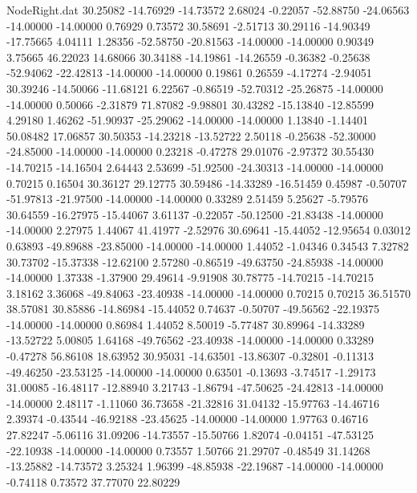 \begin{filecontents}{NodeRight.dat}
  30.25082  -14.76929  -14.73572     2.68024   -0.22057  -52.88750  -24.06563  -14.00000  -14.00000    0.76929    0.73572   30.58691   -2.51713
  30.29116  -14.90349  -17.75665     4.04111    1.28356  -52.58750  -20.81563  -14.00000  -14.00000    0.90349    3.75665   46.22023   14.68066
  30.34188  -14.19861  -14.26559    -0.36382   -0.25638  -52.94062  -22.42813  -14.00000  -14.00000    0.19861    0.26559   -4.17274   -2.94051
  30.39246  -14.50066  -11.68121     6.22567   -0.86519  -52.70312  -25.26875  -14.00000  -14.00000    0.50066   -2.31879   71.87082   -9.98801
  30.43282  -15.13840  -12.85599     4.29180    1.46262  -51.90937  -25.29062  -14.00000  -14.00000    1.13840   -1.14401   50.08482   17.06857
  30.50353  -14.23218  -13.52722     2.50118   -0.25638  -52.30000  -24.85000  -14.00000  -14.00000    0.23218   -0.47278   29.01076   -2.97372
  30.55430  -14.70215  -14.16504     2.64443    2.53699  -51.92500  -24.30313  -14.00000  -14.00000    0.70215    0.16504   30.36127   29.12775
  30.59486  -14.33289  -16.51459     0.45987   -0.50707  -51.97813  -21.97500  -14.00000  -14.00000    0.33289    2.51459    5.25627   -5.79576
  30.64559  -16.27975  -15.44067     3.61137   -0.22057  -50.12500  -21.83438  -14.00000  -14.00000    2.27975    1.44067   41.41977   -2.52976
  30.69641  -15.44052  -12.95654     0.03012    0.63893  -49.89688  -23.85000  -14.00000  -14.00000    1.44052   -1.04346    0.34543    7.32782
  30.73702  -15.37338  -12.62100     2.57280   -0.86519  -49.63750  -24.85938  -14.00000  -14.00000    1.37338   -1.37900   29.49614   -9.91908
  30.78775  -14.70215  -14.70215     3.18162    3.36068  -49.84063  -23.40938  -14.00000  -14.00000    0.70215    0.70215   36.51570   38.57081
  30.85886  -14.86984  -15.44052     0.74637   -0.50707  -49.56562  -22.19375  -14.00000  -14.00000    0.86984    1.44052    8.50019   -5.77487
  30.89964  -14.33289  -13.52722     5.00805    1.64168  -49.76562  -23.40938  -14.00000  -14.00000    0.33289   -0.47278   56.86108   18.63952
  30.95031  -14.63501  -13.86307    -0.32801   -0.11313  -49.46250  -23.53125  -14.00000  -14.00000    0.63501   -0.13693   -3.74517   -1.29173
  31.00085  -16.48117  -12.88940     3.21743   -1.86794  -47.50625  -24.42813  -14.00000  -14.00000    2.48117   -1.11060   36.73658  -21.32816
  31.04132  -15.97763  -14.46716     2.39374   -0.43544  -46.92188  -23.45625  -14.00000  -14.00000    1.97763    0.46716   27.82247   -5.06116
  31.09206  -14.73557  -15.50766     1.82074   -0.04151  -47.53125  -22.10938  -14.00000  -14.00000    0.73557    1.50766   21.29707   -0.48549
  31.14268  -13.25882  -14.73572     3.25324    1.96399  -48.85938  -22.19687  -14.00000  -14.00000   -0.74118    0.73572   37.77070   22.80229

\end{filecontents}
